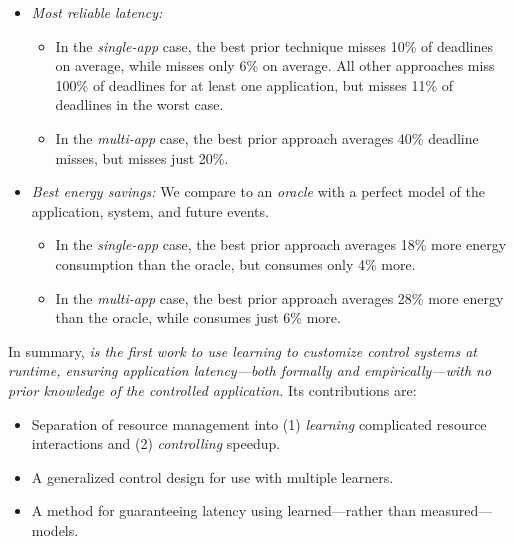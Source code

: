 \begin{itemize}[leftmargin=1em]
\item \textit{Most reliable latency:}
  \begin{itemize}[leftmargin=1em]
  \item In the \emph{single-app} case, the best prior technique misses
    10\% of deadlines on average, while \SYSTEM{} misses only 6\% on
    average. All other approaches miss 100\% of deadlines for at least
    one application, but \SYSTEM{} misses 11\% of deadlines in the
    worst case.
  \item In the \emph{multi-app} case, the best prior approach averages
    40\% deadline misses, but \SYSTEM{} misses just 20\%.
  \end{itemize}
\item \textit{Best energy savings:} We compare to an \emph{oracle}
  with a perfect model of the application, system, and future events.
  \begin{itemize}[leftmargin=1em]
  \item In the \emph{single-app} case, the best prior approach
    averages 18\% more energy consumption than the oracle, but
    \SYSTEM{} consumes only 4\% more.
  \item In the \emph{multi-app} case, the best prior approach averages
    28\% more energy than the oracle, while \SYSTEM{} consumes just
    6\% more.
  \end{itemize}
\end{itemize}

In summary, \emph{\SYSTEM{} is the first work to use learning to
  customize control systems at runtime, ensuring application
  latency---both formally and empirically---with no prior
  knowledge of the controlled application.}  Its contributions are:
\begin{itemize}[leftmargin=1em]
\item Separation of resource management into (1) \emph{learning}
  complicated resource interactions and (2) \emph{controlling}
  speedup.
\item A generalized control design for use with multiple learners.
\item A method for guaranteeing latency using learned---rather
  than measured---models.
\end{itemize}


